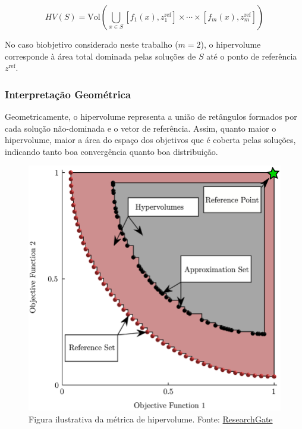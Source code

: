 \documentclass[conference]{IEEEtran}
\begin{document}
\begin{equation}
HV(S) = \text{Vol} \left( \bigcup_{x \in S} [f_1(x), z_1^{\text{ref}}] \times \cdots \times [f_m(x), z_m^{\text{ref}}] \right)
\end{equation}

No caso biobjetivo considerado neste trabalho ($m = 2$), o hipervolume corresponde à área total dominada pelas soluções de $S$ até o
ponto de referência $z^{\text{ref}}$.

\subsubsection{Interpretação Geométrica}

Geometricamente, o hipervolume representa a união de retângulos formados por cada solução não-dominada e o vetor de referência.
Assim, quanto maior o hipervolume, maior a área do espaço dos objetivos que é coberta pelas soluções, indicando tanto boa convergência quanto boa distribuição.

\begin{figure}[h!]
	\caption{\label{fig:hypervolume}Figura ilustrativa da métrica de hipervolume. Fonte: \href{https://www.researchgate.net/figure/Illustration-of-the-hypervolume-metric-for-an-optimization-problem-with-two-objective_fig3_331214313}{ResearchGate}}
	\begin{center}
    \includegraphics[width=\columnwidth,clip]{Illustration-hypervolume-metric.png}
	\end{center}
\end{figure}
\end{document}
